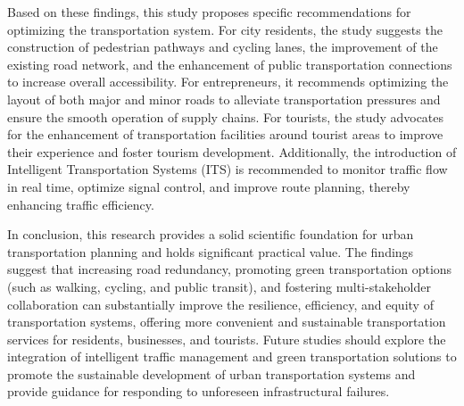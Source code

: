 \documentclass{mcmthesis}
\begin{document}
Based on these findings, this study proposes specific recommendations for optimizing the transportation system. For city residents, the study suggests the construction of pedestrian pathways and cycling lanes, the improvement of the existing road network, and the enhancement of public transportation connections to increase overall accessibility. For entrepreneurs, it recommends optimizing the layout of both major and minor roads to alleviate transportation pressures and ensure the smooth operation of supply chains. For tourists, the study advocates for the enhancement of transportation facilities around tourist areas to improve their experience and foster tourism development. Additionally, the introduction of Intelligent Transportation Systems (ITS) is recommended to monitor traffic flow in real time, optimize signal control, and improve route planning, thereby enhancing traffic efficiency.

In conclusion, this research provides a solid scientific foundation for urban transportation planning and holds significant practical value. The findings suggest that increasing road redundancy, promoting green transportation options (such as walking, cycling, and public transit), and fostering multi-stakeholder collaboration can substantially improve the resilience, efficiency, and equity of transportation systems, offering more convenient and sustainable transportation services for residents, businesses, and tourists. Future studies should explore the integration of intelligent traffic management and green transportation solutions to promote the sustainable development of urban transportation systems and provide guidance for responding to unforeseen infrastructural failures.
\end{document}
